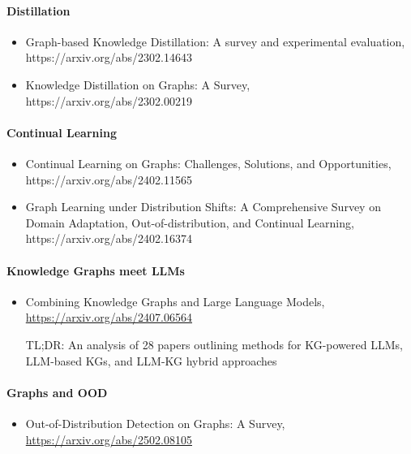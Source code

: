 \paragraph{Distillation}

\begin{itemize}
\item Graph-based Knowledge Distillation: A survey and experimental evaluation, https://arxiv.org/abs/2302.14643

\item Knowledge Distillation on Graphs: A Survey, https://arxiv.org/abs/2302.00219
\end{itemize}

\paragraph{Continual Learning}

\begin{itemize}
\item Continual Learning on Graphs: Challenges, Solutions, and Opportunities, https://arxiv.org/abs/2402.11565

\item Graph Learning under Distribution Shifts: A Comprehensive Survey on Domain Adaptation, Out-of-distribution, and Continual Learning, https://arxiv.org/abs/2402.16374
\end{itemize}

\paragraph{Knowledge Graphs meet LLMs}

\begin{itemize}
\item Combining Knowledge Graphs and Large Language Models, \url{https://arxiv.org/abs/2407.06564}

TL;DR: An analysis of 28 papers outlining methods for KG-powered LLMs, LLM-based KGs, and LLM-KG hybrid approaches
\end{itemize}

\paragraph{Graphs and OOD}

\begin{itemize}
\item Out-of-Distribution Detection on Graphs: A Survey,
\url{https://arxiv.org/abs/2502.08105}
\end{itemize}


